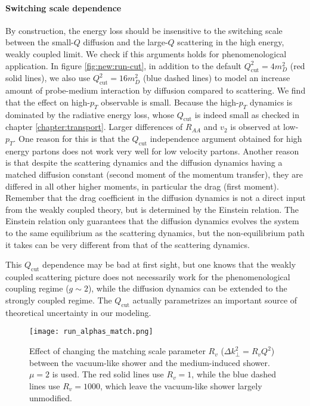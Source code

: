 \paragraph{Switching scale dependence} By construction, the energy loss should be insensitive to the switching scale between the small-$Q$ diffusion and the large-$Q$ scattering in the high energy, weakly coupled limit.
We check if this arguments holds for phenomenological application.
In figure \ref{fig:new:run-cut}, in addition to the default $Q_\textrm{cut}^2 = 4 m_D^2$ (red solid lines), we also use $Q_\textrm{cut}^2 = 16 m_D^2$ (blue dashed lines) to model an increase amount of probe-medium interaction by diffusion compared to scattering.
We find that the effect on high-$p_T$ observable is small.
Because the high-$p_T$ dynamics is dominated by the radiative energy loss, whose $Q_\textrm{cut}$ is indeed small as checked in chapter \ref{chapter:transport}.
Larger differences of $R_{AA}$ and $v_2$ is observed at low-$p_T$.
One reason for this is that the $Q_\textrm{cut}$ independence argument obtained for high energy partons does not work very well for low velocity partons.
Another reason is that despite the scattering dynamics and the diffusion dynamics having a matched diffusion constant (second moment of the momentum transfer), they are differed in all other higher moments, in particular the drag (first moment).
Remember that the drag coefficient in the diffusion dynamics is not a direct input from the weakly coupled theory, but is determined by the Einstein relation.
The Einstein relation only guarantees that the diffusion dynamics evolves the system to the same equilibrium as the scattering dynamics, but the non-equilibrium path it takes can be very different from that of the scattering dynamics.

This $Q_\textrm{cut}$ dependence may be bad at first sight, but one knows that the weakly coupled scattering picture does not necessarily work for the phenomenological coupling regime ($g\sim 2$), while the diffusion dynamics can be extended to the strongly coupled regime.
The $Q_\textrm{cut}$ actually parametrizes an important source of theoretical uncertainty in our modeling.

\begin{figure}
\singlespacing
\centering
\texttt{[image: run\_alphas\_match.png]}
\caption[Effect of changing the matching scale parameter $R_v$]{Effect of changing the matching scale parameter $R_v$ ($\Delta k_\perp^2 = R_v Q^2$) between the vacuum-like shower and the medium-induced shower. $\mu=2$ is used. The red solid lines use $R_v =1$, while the blue dashed lines use $R_v = 1000$, which leave the vacuum-like shower largely unmodified.}
\label{fig:new:run-match}
\end{figure}

